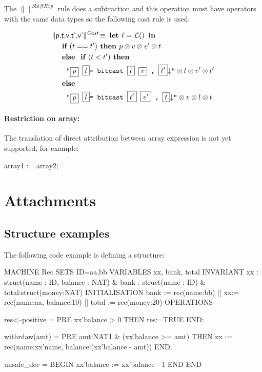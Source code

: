 \documentclass[10pt,a4paper]{article}
\newcommand{\trad}[2]{\ensuremath{\lVert \textsf{#1} \rVert^{\textit{#2}}}}
\newcommand{\nl}[0]{\ensuremath{\downarrow}}
\DeclareMathOperator{\isdef}{\equiv}
\DeclareMathOperator{\lbl}{\mathcal{L}()}
\newcommand{\llvm}[1]{\texttt{#1}}
\newcommand{\IF}[0]{\textbf{ if }}
\newcommand{\ELSE}[0]{\textbf{ else }}
\newcommand{\THEN}[0]{\textbf{ then }}
\newcommand{\LET}[0]{\textbf{ let }}
\newcommand{\IN}[0]{\textbf{ in }}
\newcommand{\PH}[1]{\framebox{$#1$}}
\newcommand{\sep}[0]{\otimes}
\begin{document}
The \trad{}{ShiftExp} rule does a subtraction and this operation must have operators with the same data types so the following cast rule is used:

\begin{align*}
&\trad{p,t,v,t',v'}{Cast} \isdef \LET  \ell = \lbl \IN \\
&\quad \IF ( t == t') \THEN p \sep v \sep v' \sep t  \\
&\quad \ELSE \IF (t<t') \THEN \\
&\quad \quad \llvm{"\PH{p} \PH{l}= bitcast \PH{t} \PH{v} , \PH{t'}\nl"}  \sep l \sep v' \sep t'\\ 
&\quad \ELSE \\ 
&\quad \quad \llvm{"\PH{p} \PH{l}= bitcast \PH{t'} \PH{v'} , \PH{t}\nl"} \sep v \sep l \sep t \\ 
\end{align*}

\paragraph{Restriction on array:} The translation of direct attribution
 between array expression is not yet supported, for example:

\begin{pascalcode}
 array1 := array2;
\end{pascalcode}


\section*{Attachments}

\subsection{Structure examples}

The following code example is defining a structure:


\begin{ccode}
MACHINE Rec
SETS
 ID={aa,bb}
VARIABLES xx, bank, total
INVARIANT
 xx : struct(name : ID, balance : NAT) & bank : struct(name : ID) &
 total:struct(money:NAT)
INITIALISATION 
 bank := rec(name:bb) ||
 xx:= rec(name:aa, balance:10) ||
 total := rec(money:20)
OPERATIONS

  res<--positive = 
  PRE xx'balance > 0 THEN
  res:=TRUE
  END;

  withrdaw(amt) = 
  PRE amt:NAT1 & (xx'balance >= amt) THEN
     xx := rec(name:xx'name, balance:(xx'balance - amt))
  END;
  
  unsafe_dec = 
  BEGIN
       xx'balance := xx'balance - 1
  END
END
\end{ccode}
\end{document}
